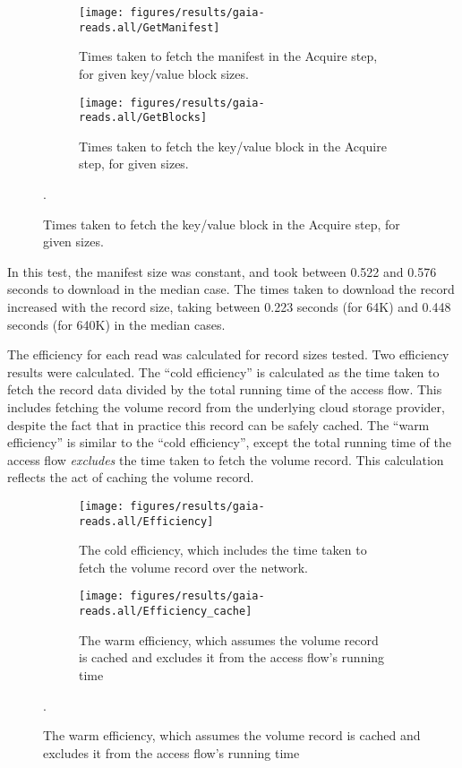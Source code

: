 \begin{figure}[htp!]
   \centering
   \caption{Box-and-wiskers plots of the Acquire stage performance.}
   \begin{subfigure}[b]{.8\textwidth}
      \texttt{[image: figures/results/gaia-reads.all/GetManifest]}
      \label{fig:gaia-read-getmanifest}
      \caption{Times taken to fetch the manifest in the Acquire step, for given
      key/value block sizes.}
   \end{subfigure}
   \begin{subfigure}[b]{.8\textwidth}
      \texttt{[image: figures/results/gaia-reads.all/GetBlocks]}
      \label{fig:gaia-read-discover}
      \caption{Times taken to fetch the key/value block in the Acquire step, for
      given sizes.}
   \end{subfigure}
   \label{fig:gaia-acquire-breakdown}.
\end{figure}

In this test, the manifest size was constant, and took between 0.522 and 0.576 
seconds to download in the median case.  The times taken to download the record
increased with the record size, taking between 0.223 seconds (for 64K) and 0.448
seconds (for 640K) in the median cases.

The efficiency for each read was calculated for record sizes tested.  Two
efficiency results were calculated.  The ``cold efficiency'' is calculated as
the time taken to fetch the record data
divided by the total running time of the access flow.  This includes fetching
the volume record from the underlying cloud storage provider, despite the fact
that in practice this record can be safely cached.  The ``warm efficiency'' is
similar to the ``cold efficiency'', except the total running time of the access
flow \emph{excludes} the time taken to fetch the volume record.  This
calculation reflects the act of caching the volume record.

\begin{figure}[htp!]
   \centering
   \caption{Box-and-wiskers plots of Gaia's read efficiencies.}
   \begin{subfigure}[b]{.8\textwidth}
      \texttt{[image: figures/results/gaia-reads.all/Efficiency]}
      \label{fig:gaia-read-getmanifest}
      \caption{The cold efficiency, which includes the time taken to fetch the
      volume record over the network.}
   \end{subfigure}
   \begin{subfigure}[b]{.8\textwidth}
      \texttt{[image: figures/results/gaia-reads.all/Efficiency\_cache]}
      \label{fig:gaia-read-discover}
      \caption{The warm efficiency, which assumes the volume record is cached
      and excludes it from the access flow's running time}
   \end{subfigure}
   \label{fig:gaia-read-efficiencies}.
\end{figure}

